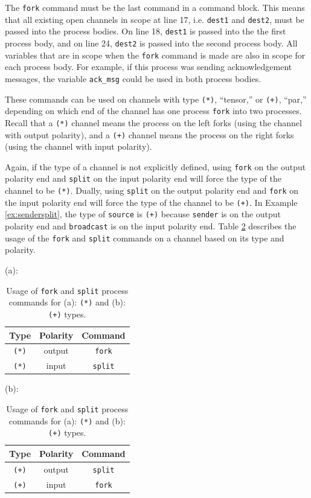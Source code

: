 \documentclass[11pt]{article}
\begin{document}
The \lstinline$fork$ command must be the last command in a command block. 
This means that all existing open channels in scope at line 17, i.e. \lstinline$dest1$ and \lstinline$dest2$, must be passed into the process bodies.
On line 18, \lstinline$dest1$ is passed into the the first process body, and on line 24, \lstinline$dest2$ is passed into the second process body.
All variables that are in scope when the \lstinline$fork$ command is made are also in scope for each process body.
For example, if this process was sending acknowledgement messages, the variable \lstinline$ack_msg$ could be used in both process bodies.

These commands can be used on channels with type \lstinline$(*)$, ``tensor,'' or \lstinline$(+)$, ``par,'' depending on which end of the channel has one process \lstinline$fork$ into two processes.
Recall that a \lstinline$(*)$ channel means the process on the left forks (using the channel with output polarity), and a \lstinline$(+)$ channel means the process on the right forks (using the channel with input polarity).

Again, if the type of a channel is not explicitly defined, using \lstinline$fork$ on the output polarity end and \lstinline$split$ on the input polarity end will force the type of the channel to be \lstinline$(*)$.
Dually, using \lstinline$split$ on the output polarity end and \lstinline$fork$ on the input polarity end will force the type of the channel to be \lstinline$(+)$.
In Example \ref{ex:sendersplit}, the type of \lstinline$source$ is \lstinline$(+)$ because \lstinline$sender$ is on the output polarity end and \lstinline$broadcast$ is on the input polarity end.
Table \ref{Table: Usage of fork and split process commands} describes the usage of the \lstinline$fork$ and \lstinline$split$ commands on a channel based on its type and polarity.
\begin{table}[h]
\begin{center}
	(a): \quad \begin{tabular}{  c | c || c }
		 Type & Polarity & Command \\
		 \hline
		 \hline      
		 \lstinline$(*)$ & output  & \lstinline$fork$ \\
		 \hline
		 \lstinline$(*)$ & input  & \lstinline$split$ 
	\end{tabular}
	\quad \quad 
	(b): \quad \begin{tabular}{  c | c || c }
		  Type & Polarity & Command \\
		 \hline
		 \hline      
		 \lstinline$(+)$ & output  & \lstinline$split$ \\
		 \hline
		 \lstinline$(+)$ & input  & \lstinline$fork$ 
	\end{tabular}
	\caption{Usage of \lstinline$fork$ and \lstinline$split$ process commands for (a): \lstinline$(*)$ and (b): \lstinline$(+)$ types.}
	\label{Table: Usage of fork and split process commands}
\end{center}
\end{table}
\end{document}
